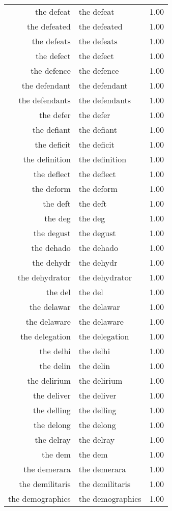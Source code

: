 \begin{table}[ht]
\begin{tabular}{rlr}
  the defeat & the defeat & 1.00 \\ 
  the defeated & the defeated & 1.00 \\ 
  the defeats & the defeats & 1.00 \\ 
  the defect & the defect & 1.00 \\ 
  the defence & the defence & 1.00 \\ 
  the defendant & the defendant & 1.00 \\ 
  the defendants & the defendants & 1.00 \\ 
  the defer & the defer & 1.00 \\ 
  the defiant & the defiant & 1.00 \\ 
  the deficit & the deficit & 1.00 \\ 
  the definition & the definition & 1.00 \\ 
  the deflect & the deflect & 1.00 \\ 
  the deform & the deform & 1.00 \\ 
  the deft & the deft & 1.00 \\ 
  the deg & the deg & 1.00 \\ 
  the degust & the degust & 1.00 \\ 
  the dehado & the dehado & 1.00 \\ 
  the dehydr & the dehydr & 1.00 \\ 
  the dehydrator & the dehydrator & 1.00 \\ 
  the del & the del & 1.00 \\ 
  the delawar & the delawar & 1.00 \\ 
  the delaware & the delaware & 1.00 \\ 
  the delegation & the delegation & 1.00 \\ 
  the delhi & the delhi & 1.00 \\ 
  the delin & the delin & 1.00 \\ 
  the delirium & the delirium & 1.00 \\ 
  the deliver & the deliver & 1.00 \\ 
  the delling & the delling & 1.00 \\ 
  the delong & the delong & 1.00 \\ 
  the delray & the delray & 1.00 \\ 
  the dem & the dem & 1.00 \\ 
  the demerara & the demerara & 1.00 \\ 
  the demilitaris & the demilitaris & 1.00 \\ 
  the demographics & the demographics & 1.00 \\ 

\end{tabular}
\end{table}
